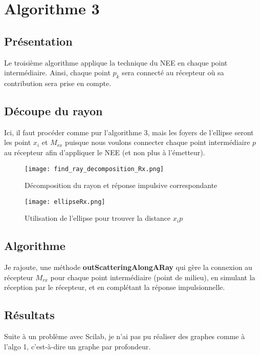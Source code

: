 \chapter{Algorithme 3}

\section{Présentation}

Le troisième algorithme applique la technique du NEE en chaque point intermédiaire. Ainsi, chaque point $p_k$ sera connecté au récepteur où sa contribution sera prise en compte.

\section{Découpe du rayon}

Ici, il faut procéder comme pur l'algorithme 3, mais les foyers de l'ellipse seront les point $x_i$ et $M_{rx}$ puisque nous voulons connecter chaque point intermédiaire $p$ au récepteur afin d'appliquer le NEE (et non plus à l'émetteur).

\begin{figure}[h!]
\centering
\texttt{[image: find\_ray\_decomposition\_Rx.png]}
\caption{Décomposition du rayon et réponse impulsive correspondante}
\end{figure}

\begin{figure}[h!]
\centering
\texttt{[image: ellipseRx.png]}
\caption{Utilisation de l'ellipse pour trouver la distance $x_i p$}
\end{figure}

\section{Algorithme}

Je rajoute, une méthode \textbf{outScatteringAlongARay} qui gère la connexion au récepteur $M_{rx}$ pour chaque point intermédiaire (point de milieu), en simulant la réception par le récepteur, et en complétant la réponse impulsionnelle.

\section{Résultats}

Suite à un problème avec Scilab, je n'ai pas pu réaliser des graphes comme à l'algo 1, c'est-à-dire un graphe par profondeur.

